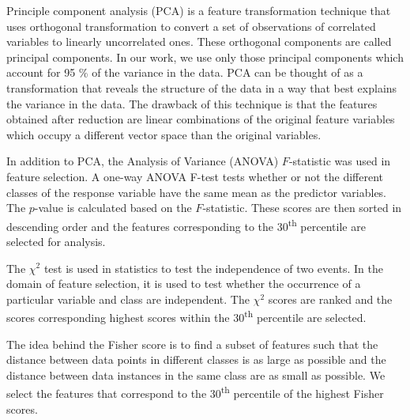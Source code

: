Principle component analysis (PCA)\cite{pca} is a feature transformation technique that uses orthogonal transformation to convert a set of observations of correlated variables to linearly uncorrelated ones. These orthogonal components are called principal components. In our work, we use only those principal components which account for 95 \% of the variance in the data. PCA can be thought of as a transformation that reveals the structure of the data in a way that best explains the variance in the data. The drawback of this technique is that the features obtained after reduction are linear combinations of the original feature variables which occupy a different vector space than the original variables. 

In addition to PCA, the Analysis of Variance (ANOVA) $F$-statistic \cite{anova} was used in feature selection. A one-way ANOVA F-test tests whether or not the different classes of the response variable have the same mean as the predictor variables. The $p$-value is calculated based on the $F$-statistic. These scores are then sorted in descending order and the features corresponding to the 30\textsuperscript{th} percentile are selected for analysis.

The ${\chi}^2$ test is used in statistics to test the independence of two events. In the domain of feature selection, it is used to test whether the occurrence of a particular variable and class are independent. The ${\chi}^2$ scores are ranked and the scores corresponding highest scores within the 30\textsuperscript{th} percentile are selected.

The idea behind the Fisher score is to find a subset of features such that the distance between data points in different classes is as large as possible and the distance between data instances in the same class are as small as possible. We select the features that correspond to the 30\textsuperscript{th} percentile of the highest Fisher scores.


